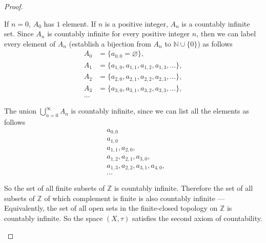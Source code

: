 \begin{proof}
\begin{enumerate}[label={(\roman*)}]
		      If $n = 0$, $A_{0}$ has $1$ element. If $n$ is a positive integer, $A_{n}$ is a countably infinite set. Since $A_{n}$ is countably infinite for every positive integer $n$, then we can label every element of $A_{n}$ (establish a bijection from $A_{n}$ to $\mathbb{N}\cup\{0\}$) as follows
		      \begin{align*}
			      A_{0}  & = \{ a_{0,0} = \varnothing \},                     \\
			      A_{1}  & = \{ a_{1,0}, a_{1,1}, a_{1,2}, a_{1,3},\ldots \}, \\
			      A_{2}  & = \{ a_{2,0}, a_{2,1}, a_{2,2}, a_{2,3},\ldots \}, \\
			      A_{3}  & = \{ a_{3,0}, a_{3,1}, a_{3,2}, a_{3,3},\ldots \}, \\
			      \ldots &
		      \end{align*}

		      The union $\bigcup^{\infty}_{n=0} A_{n}$ is countably infinite, since we can list all the elements as follows
		      \begin{align*}
			       & a_{0,0}                             \\
			       & a_{1,0}                             \\
			       & a_{1,1}, a_{2,0},                   \\
			       & a_{1,2}, a_{2,1}, a_{3,0},          \\
			       & a_{1,3}, a_{2,2}, a_{3,1}, a_{4,0}, \\
			       & \ldots
		      \end{align*}

		      So the set of all finite subsets of $\mathbb{Z}$ is countably infinite. Therefore the set of all subsets of $\mathbb{Z}$ of which complement is finite is also countably infinite --- Equivalently, the set of all open sets in the finite-closed topology on $\mathbb{Z}$ is countably infinite. So the space $(X, \tau)$ satisfies the second axiom of countability.
	\end{enumerate}
\end{proof}
\newpage

